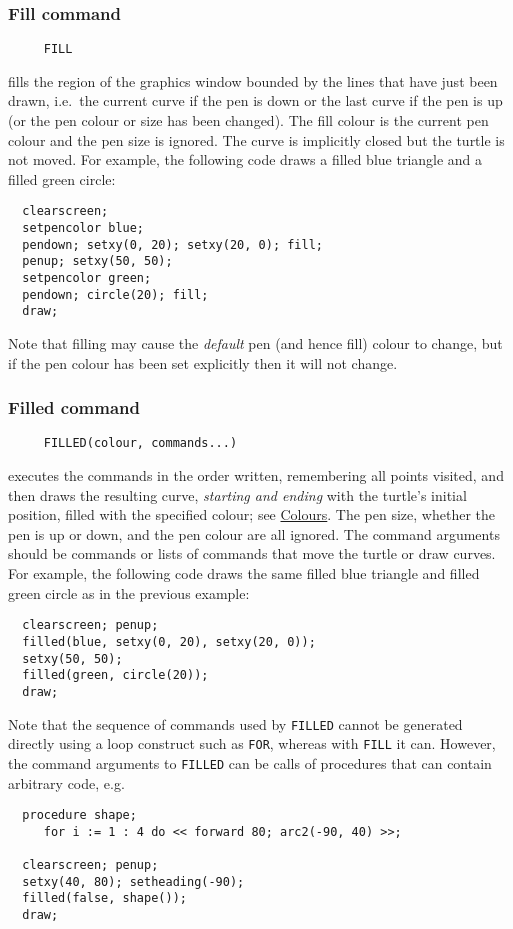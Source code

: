 \subsubsection*{Fill command}
\begin{verbatim}
     FILL
\end{verbatim}
fills the region of the graphics window bounded by the lines that have
just been drawn, i.e.\ the current curve if the pen is down or the
last curve if the pen is up (or the pen colour or size has been
changed).  The fill colour is the current pen colour and the pen size
is ignored.  The curve is implicitly closed but the turtle is not
moved.  For example, the following code draws a filled blue triangle
and a filled green circle:
\begin{verbatim}
  clearscreen;
  setpencolor blue;
  pendown; setxy(0, 20); setxy(20, 0); fill;
  penup; setxy(50, 50);
  setpencolor green;
  pendown; circle(20); fill;
  draw;
\end{verbatim}
Note that filling may cause the \emph{default} pen (and hence fill)
colour to change, but if the pen colour has been set explicitly then
it will not change.

\subsubsection*{Filled command}
\begin{verbatim}
     FILLED(colour, commands...)
\end{verbatim}
executes the commands in the order written, remembering all points
visited, and then draws the resulting curve, \emph{starting and
ending} with the turtle's initial position, filled with the specified
colour; see \hyperref[logoturtle:Colours]{Colours}.  The pen size,
whether the pen is up or down, and the pen colour are all ignored.
The command arguments should be commands or lists of commands that
move the turtle or draw curves.  For example, the following code draws
the same filled blue triangle and filled green circle as in the
previous example:
\begin{verbatim}
  clearscreen; penup;
  filled(blue, setxy(0, 20), setxy(20, 0));
  setxy(50, 50);
  filled(green, circle(20));
  draw;
\end{verbatim}
Note that the sequence of commands used by \texttt{FILLED} cannot be
generated directly using a loop construct such as \texttt{FOR},
whereas with \texttt{FILL} it can.  However, the command arguments to
\texttt{FILLED} can be calls of procedures that can contain arbitrary
code, e.g.
\begin{verbatim}
  procedure shape;
     for i := 1 : 4 do << forward 80; arc2(-90, 40) >>;

  clearscreen; penup;
  setxy(40, 80); setheading(-90);
  filled(false, shape());
  draw;
\end{verbatim}

